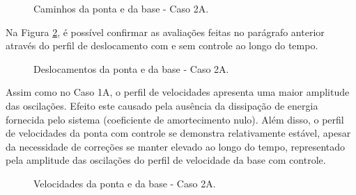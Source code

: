 \begin{figure}[H]
    \centering
    \hfill
    \hfill
    \hfill
    \caption{Caminhos da ponta e da base - Caso 2A.}
    \label{fig:2A_cam}
\end{figure}

Na Figura \ref{fig:2A_des}, é possível confirmar as avaliações feitas no parágrafo anterior através do perfil de deslocamento com e sem controle ao longo do tempo.

\begin{figure}[H]
    \centering
    \hfill
    \caption{Deslocamentos da ponta e da base - Caso 2A.}
    \label{fig:2A_des}
\end{figure}

Assim como no Caso 1A, o perfil de velocidades apresenta uma maior amplitude das oscilações. Efeito este causado pela ausência da dissipação de energia fornecida pelo sistema (coeficiente de amortecimento nulo). Além disso, o perfil de velocidades da ponta com controle se demonstra relativamente estável, apesar da necessidade de correções se manter elevado ao longo do tempo, representado pela amplitude das oscilações do perfil de velocidade da base com controle.

\begin{figure}[H]
    \centering
    \hfill
    \caption{Velocidades da ponta e da base - Caso 2A.}
    \label{fig:2A_vel}
\end{figure}

